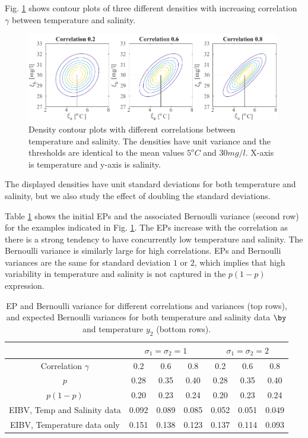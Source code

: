 Fig. \ref{illus_bivarDens} shows contour plots of three different
densities with increasing correlation $\gamma$ between temperature and
salinity. 
\begin{figure}[h!] \centering
  \includegraphics[width=0.99\textwidth]{Figures/illus_bivar.pdf}
  \caption{Density contour plots with different correlations between
    temperature and salinity. The densities have unit variance and the
    thresholds are identical to the mean values $5^o C$ and
    $30 mg/l$. X-axis is temperature and y-axis is salinity.}
\label{illus_bivarDens}
\end{figure}
The displayed densities have unit standard deviations for both
temperature and salinity, but we also study the effect of doubling the
standard deviations.

Table \ref{tab:sim_rhoab} shows the initial EPs and the associated
Bernoulli variance (second row) for the examples indicated in Fig.
\ref{illus_bivarDens}. The EPs increase with the correlation as there
is a strong tendency to have concurrently low temperature and salinity. The Bernoulli variance is similarly large for high
correlations. EPs and Bernoulli variances are the same for standard
deviation $1$ or $2$, which implies that high variability in
temperature and salinity is not captured in the $p(1-p)$ expression.

\begin{table}[!h] \centering \caption{EP and Bernoulli variance for
    different correlations and variances (top rows), and expected
    Bernoulli variances for both temperature and salinity data $\by$ and 
    temperature $y_2$ (bottom rows).}
  \begin{tabular}{c|ccc|ccc}
 &\multicolumn{3}{c}{$\sigma_1=\sigma_2=1$} & \multicolumn{3}{c}{$\sigma_1=\sigma_2=2$} \\
\hline
Correlation $\gamma$ & 0.2 & 0.6 & 0.8 & 0.2 & 0.6 & 0.8 \\
\hline
$p$ & 0.28 & 0.35 & 0.40 & 0.28 & 0.35 & 0.40 \\ 
$p(1-p)$ & 0.20 & 0.23 & 0.24 & 0.20 & 0.23 & 0.24 \\ 
EIBV, Temp and Salinity data & 0.092 & 0.089 & 0.085 & 0.052 & 0.051 & 0.049 \\ 
EIBV, Temperature data only & 0.151 & 0.138 & 0.123 & 0.137 & 0.114 & 0.093 \\ 
\hline
\end{tabular}
\label{tab:sim_rhoab}
\end{table}

